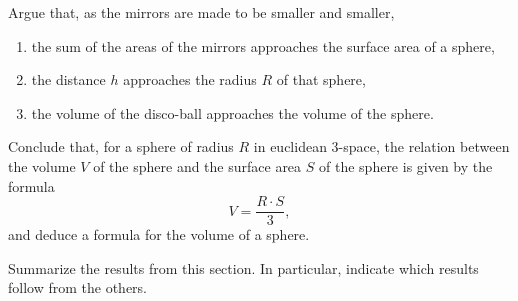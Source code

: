 \documentclass[hints,handout,noauthor,nooutcomes,12pt]{ximera}
\begin{document}
\begin{problem}
Argue that, as the mirrors are made to be smaller and smaller,
\begin{enumerate}
\item the sum of the areas of the mirrors approaches the surface area of a sphere,
\item the distance $h$ approaches the radius $R$ of that sphere,
\item the volume of the disco-ball approaches the volume of the sphere.
\end{enumerate}
Conclude that, for a sphere of radius $R$ in euclidean $3$-space, the relation
between the volume $V$ of the sphere and the surface area $S$ of the sphere is
given by the formula%
\[
V=\frac{R\cdot S}{3},
\]
and deduce a formula for the volume of a sphere.

\end{problem}





\begin{problem}
Summarize the results from this section. In particular, indicate which
results follow from the others.
\begin{freeResponse}
\end{freeResponse}
\end{problem}
\end{document}
